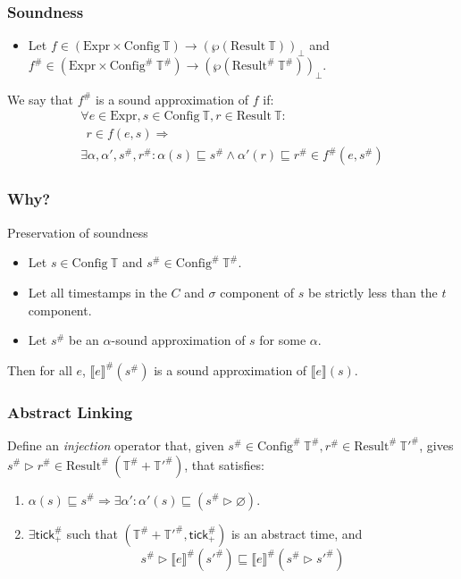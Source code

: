 \documentclass{beamer}
\newcommand*{\A}[1]{{#1}^{\#}}
\newcommand*{\Expr}{\text{Expr}}
\newcommand*{\Time}{\mathbb{T}}
\newcommand*{\ATime}{\A{\Time}}
\newcommand*{\Config}[1]{\text{Config}\:{#1}}
\newcommand*{\AConfig}[1]{\A{\text{Config}}\:{#1}}
\newcommand*{\Result}[1]{\text{Result}\:{#1}}
\newcommand*{\AResult}[1]{\A{\text{Result}}\:{#1}}
\newcommand*{\sembracket}[1]{\lBrack{#1}\rBrack}
\newcommand*{\tick}{\mathsf{tick}}
\begin{document}
\begin{frame}[c]
  \frametitle{Soundness}
  \begin{definition}
    \begin{itemize}
      \item Let $f\in(\Expr\times\Config{\Time})\rightarrow(\wp(\Result{\Time}))_{\bot}$ and $\A{f}\in(\Expr\times\AConfig{\ATime})\rightarrow(\wp(\AResult{\ATime}))_{\bot}$.
    \end{itemize}

    We say that $\A{f}$ is a sound approximation of $f$ if:
    \begin{align*}
      \forall e\in\Expr,s\in\Config{\Time},r\in\Result{\Time}: \\
      \:\:r\in f(e,s)\Rightarrow                               \\
      \exists\alpha,\alpha',\A{s},\A{r}:\alpha(s)\sqsubseteq\A{s}\wedge\alpha'(r)\sqsubseteq\A{r}\in\A{f}(e,\A{s})
    \end{align*}
  \end{definition}
\end{frame}
\begin{frame}
  \frametitle{Why?}
  \begin{block}{Preservation of soundness}
    \begin{itemize}
      \item Let $s\in\Config{\Time}$ and $\A{s}\in\AConfig{\ATime}$.
      \item Let all timestamps in the $C$ and $\sigma$ component of $s$ be strictly less than the $t$ component.
      \item Let $\A{s}$ be an $\alpha$-sound approximation of $s$ for some $\alpha$.
    \end{itemize}

    Then for all $e$, $\A{\sembracket{e}}(\A{s})$ is a sound approximation of $\sembracket{e}(s)$.
  \end{block}
\end{frame}
\begin{frame}[c]
  \frametitle{Abstract Linking}
  Define an \emph{injection} operator that, given $\A{s}\in\AConfig{\ATime},\A{r}\in\AResult{\A{\Time'}}$, gives $\A{s}\rhd\A{r}\in\AResult{(\ATime+\A{\Time'})}$, that satisfies:
  \begin{enumerate}
    \item $\alpha(s)\sqsubseteq\A{s}\Rightarrow\exists\alpha':\alpha'(s)\sqsubseteq(\A{s}\rhd\varnothing)$.
    \item $\exists\A{\tick}_{+}$ such that $(\ATime+\A{\Time'},\A{\tick}_{+})$ is an abstract time, and
          \[
            \A{s}\rhd\A{\sembracket{e}}(\A{s'})\sqsubseteq\A{\sembracket{e}}(\A{s}\rhd\A{s'})
          \]
  \end{enumerate}
\end{frame}
\end{document}

